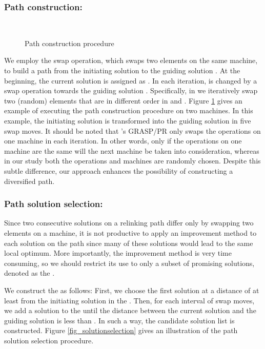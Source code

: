 \documentclass[authoryear,12pt]{elsarticle}
\begin{document}
\subsubsection{Path construction:}
\label{subsubsec_path_construction}

\begin{figure}[!htbp]
  \centering{}\\
  \centering\caption{Path construction procedure}\label{fig_pathconstruction}
\end{figure}

We employ the swap operation, which swaps two elements on the same machine, to build a path from the initiating solution  to the guiding solution . At the beginning, the current solution  is assigned as . In each iteration,  is changed by a swap operation towards the guiding solution . Specifically, in  we iteratively swap two (random) elements that are in different order in  and . Figure \ref{fig_pathconstruction} gives an example of executing the path construction procedure on two machines. In this example, the initiating solution  is transformed into the guiding solution  in five swap moves. It should be noted that \cite{Aiex2003GRASPwithPR}'s GRASP/PR only swaps the operations on one machine in each iteration. In other words, only if the operations on one machine are the same will the next machine be taken into consideration, whereas in our study both the operations and machines are randomly chosen. Despite this subtle difference, our approach enhances the possibility of constructing a diversified path.

\subsubsection{Path solution selection:}
\label{subsubsec_path_solution}

Since two consecutive solutions on a relinking path differ only by swapping two elements on a machine, it is not productive to apply an improvement method to each solution on the path since many of these solutions would lead to the same local optimum. More importantly, the improvement method is very time consuming, so we should restrict its use to only a subset of promising solutions, denoted as the .

We construct the  as follows: First, we choose the first solution at a distance of at least  from the initiating solution in the . Then, for each interval of  swap moves, we add a solution to the  until the distance between the current solution and the guiding solution is less than . In such a way, the candidate solution list  is constructed. Figure \ref{fig_solutionselection} gives an illustration of the path solution selection procedure.
\end{document}
